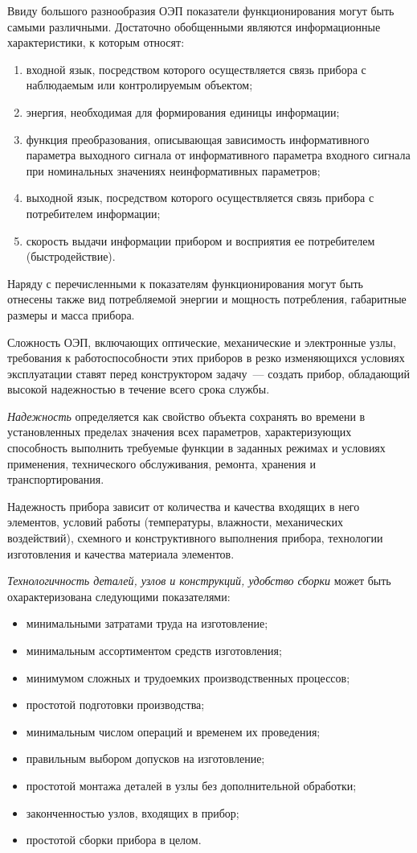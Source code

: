 Ввиду большого разнообразия ОЭП показатели функционирования могут быть самыми различными. Достаточно обобщенными являются информационные характеристики, к которым относят:
\begin{enumerate}
	\item входной язык, посредством которого осуществляется связь прибора с наблюдаемым или контролируемым объектом;
	\item энергия, необходимая для формирования единицы информации;
	\item функция преобразования, описывающая зависимость информативного параметра выходного сигнала от информативного параметра входного сигнала при номинальных значениях неинформативных параметров;
	\item выходной язык, посредством которого осуществляется связь прибора с потребителем информации;
	\item скорость выдачи информации прибором и восприятия ее потребителем (быстродействие).
\end{enumerate}

Наряду с перечисленными к показателям функционирования могут быть отнесены также вид потребляемой энергии и мощность потребления, габаритные размеры и масса прибора.

Сложность ОЭП, включающих оптические, механические и электронные узлы, требования к работоспособности этих приборов в резко изменяющихся условиях эксплуатации ставят перед конструктором задачу~--- создать прибор, обладающий высокой надежностью в течение всего срока службы.

\textit{Надежность} определяется как свойство объекта сохранять во времени в установленных пределах значения всех параметров, характеризующих способность выполнить требуемые функции в заданных режимах и условиях применения, технического обслуживания, ремонта, хранения и транспортирования. 

Надежность прибора зависит от количества и качества входящих в него элементов, условий работы (температуры, влажности, механических воздействий), схемного и конструктивного выполнения прибора, технологии изготовления и качества материала элементов.

\textit{Технологичность деталей, узлов и конструкций, удобство сборки} может быть охарактеризована следующими показателями: 
\begin{itemize}
	\item минимальными затратами труда на изготовление;
	\item минимальным ассортиментом средств изготовления;
	\item минимумом сложных и трудоемких производственных процессов;
	\item простотой подготовки производства;
	\item минимальным числом операций и временем их проведения;
	\item правильным выбором допусков на изготовление;
	\item простотой монтажа деталей в узлы без дополнительной обработки;
	\item законченностью узлов, входящих в прибор;
	\item простотой сборки прибора в целом.
\end{itemize}

